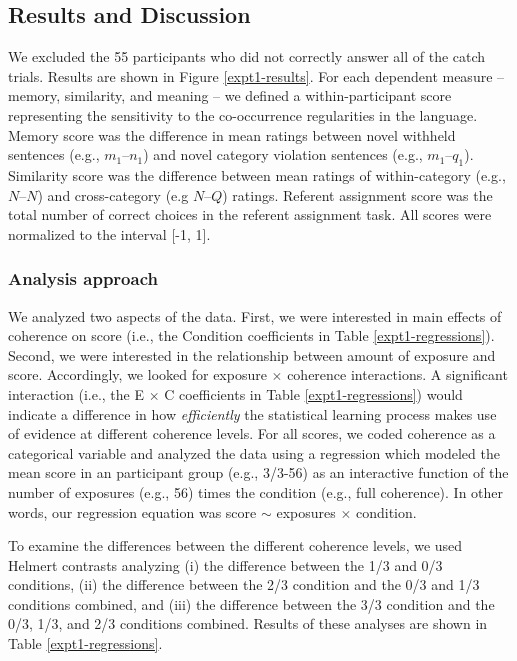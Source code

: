 \documentclass[man,floatsintext]{apa6}
\begin{document}
\subsection{Results and Discussion}
We excluded the 55 participants who did not correctly answer all of the catch trials. Results are shown in Figure \ref{expt1-results}. For each dependent measure -- memory, similarity, and meaning -- we defined a within-participant score representing the sensitivity to the co-occurrence regularities in the language. Memory score was the difference in mean ratings between novel withheld sentences (e.g., $m_1$--$n_1$) and novel category violation sentences (e.g., $m_1$--$q_1$). Similarity score was the difference between mean ratings of within-category (e.g., $N$--$N$) and cross-category (e.g $N$--$Q$) ratings. Referent assignment score was the total number of correct choices in the referent assignment task. All scores were normalized to the interval [-1, 1].

\subsubsection{Analysis approach}
We analyzed two aspects of the data. First, we were interested in main effects of coherence on score (i.e., the Condition coefficients in Table \ref{expt1-regressions}). Second, we were interested in the relationship between amount of exposure and score. Accordingly, we looked for exposure $\times$ coherence interactions. A significant interaction (i.e., the E $\times$ C coefficients in Table \ref{expt1-regressions}) would indicate a difference in how \emph{efficiently} the statistical learning process makes use of evidence at different coherence levels. For all scores, we coded coherence as a categorical variable and analyzed the data using a regression which modeled the mean score in an participant group (e.g., 3/3-56) as an interactive function of the number of exposures (e.g., 56) times the condition (e.g., full coherence). In other words, our regression equation was score $\sim$ exposures $\times$ condition.

To examine the differences between the different coherence levels, we used Helmert contrasts analyzing (i) the difference between the 1/3 and 0/3 conditions, (ii) the difference between the 2/3 condition and the 0/3 and 1/3 conditions combined, and (iii) the difference between the 3/3 condition and the 0/3, 1/3, and 2/3 conditions combined. Results of these analyses are shown in Table \ref{expt1-regressions}.
\end{document}
